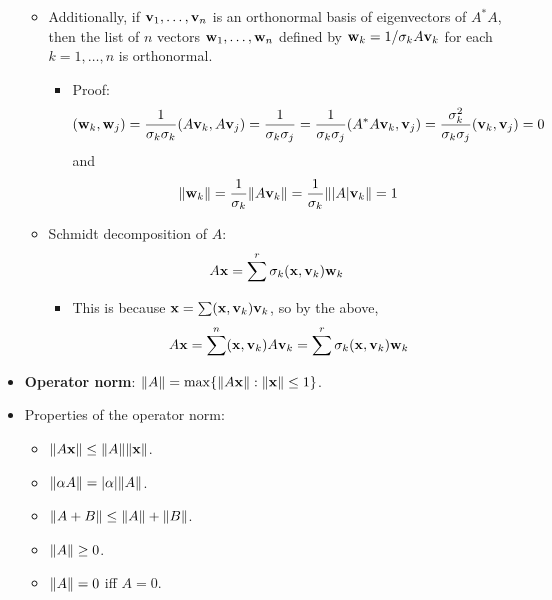 \documentclass[../../notes.tex]{subfiles}
\begin{document}
\begin{itemize}
\begin{itemize}
        \item Additionally, if $\mathbf{v}_1,\dots,\mathbf{v}_n$ is an orthonormal basis of eigenvectors of $A^*A$, then the list of $n$ vectors $\mathbf{w}_1,\dots,\mathbf{w}_n$ defined by $\mathbf{w}_k=1/\sigma_kA\mathbf{v}_k$ for each $k=1,\dots,n$ is orthonormal.
        \begin{itemize}
            \item Proof:
            \begin{equation*}
                (\mathbf{w}_k,\mathbf{w}_j) = \frac{1}{\sigma_k\sigma_k}(A\mathbf{v}_k,A\mathbf{v}_j)
                = \frac{1}{\sigma_k\sigma_j}
                = \frac{1}{\sigma_k\sigma_j}(A^*A\mathbf{v}_k,\mathbf{v}_j)
                = \frac{\sigma_k^2}{\sigma_k\sigma_j}(\mathbf{v}_k,\mathbf{v}_j)
                = 0
            \end{equation*}
            and
            \begin{equation*}
                \norm{\mathbf{w}_k} = \frac{1}{\sigma_k}\norm{A\mathbf{v}_k}
                = \frac{1}{\sigma_k}\norm{|A|\mathbf{v}_k}
                = 1
            \end{equation*}
        \end{itemize}
        \item Schmidt decomposition of $A$:
        \begin{equation*}
            A\mathbf{x} = \sum^r\sigma_k(\mathbf{x},\mathbf{v}_k)\mathbf{w}_k
        \end{equation*}
        \begin{itemize}
            \item This is because $\mathbf{x}=\sum(\mathbf{x},\mathbf{v}_k)\mathbf{v}_k$, so by the above,
            \begin{equation*}
                A\mathbf{x} = \sum^n(\mathbf{x},\mathbf{v}_k)A\mathbf{v}_k
                = \sum^r\sigma_k(\mathbf{x},\mathbf{v}_k)\mathbf{w}_k
            \end{equation*}
        \end{itemize}
    \end{itemize}
    \item \textbf{Operator norm}: $\norm{A}=\max\{\norm{A\mathbf{x}}:\norm{\mathbf{x}}\leq 1\}$.
    \item Properties of the operator norm:
    \begin{itemize}
        \item $\norm{A\mathbf{x}}\leq\norm{A}\norm{\mathbf{x}}$.
        \item $\norm{\alpha A}=|\alpha|\norm{A}$.
        \item $\norm{A+B}\leq\norm{A}+\norm{B}$.
        \item $\norm{A}\geq 0$.
        \item $\norm{A}=0$ iff $A=0$.

\end{itemize}
\end{itemize}
\end{document}
